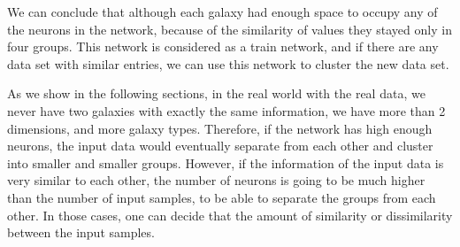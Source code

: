 We can conclude that although each galaxy had enough space to occupy any of the neurons in the network, because of the similarity of values they stayed only in four groups.
This network is considered as a train network, and if there are any data set with similar entries, we can use this network to cluster the new data set.

As we show in the following sections, in the real world with the real data, we never have two galaxies with exactly the same information, we have more than 2 dimensions, and more galaxy types. 
Therefore, if the network has high enough neurons, the input data would eventually separate from each other and cluster into smaller and smaller groups. 
However, if the information of the input data is very similar to each other, the number of neurons is going to be much higher than the number of input samples, to be able to separate the groups from each other. 
In those cases, one can decide that the amount of similarity or dissimilarity between the input samples. %



